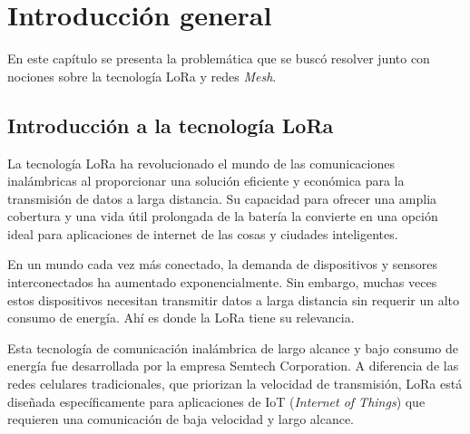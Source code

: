 
\chapter{Introducción general} %

\label{Chapter1} %
\label{IntroGeneral}


\newcommand{\keyword}[1]{\textbf{#1}}
\newcommand{\tabhead}[1]{\textbf{#1}}
\newcommand{\code}[1]{\texttt{#1}}
\newcommand{\file}[1]{\texttt{\bfseries#1}}
\newcommand{\option}[1]{\texttt{\itshape#1}}
\newcommand{\grados}{$^{\circ}$}

En este capítulo se presenta la problemática que se buscó resolver junto con nociones sobre la tecnología LoRa y redes \emph{Mesh}.

\section{Introducción a la tecnología LoRa}

La tecnología LoRa ha revolucionado el mundo de las comunicaciones inalámbricas al proporcionar una solución eficiente y económica para la transmisión de datos a larga distancia. Su capacidad para ofrecer una amplia cobertura y una vida útil prolongada de la batería la convierte en una opción ideal para aplicaciones de internet de las cosas y ciudades inteligentes.

En un mundo cada vez más conectado, la demanda de dispositivos y sensores interconectados ha aumentado exponencialmente. Sin embargo, muchas veces estos dispositivos necesitan transmitir datos a larga distancia sin requerir un alto consumo de energía. Ahí es donde la LoRa tiene su relevancia.

Esta tecnología de comunicación inalámbrica de largo alcance y bajo consumo de energía fue desarrollada por la empresa Semtech Corporation. \citep{WEBSITE:6} A diferencia de las redes celulares tradicionales, que priorizan la velocidad de transmisión, LoRa está diseñada específicamente para aplicaciones de IoT (\emph{Internet of Things}) que requieren una comunicación de baja velocidad y largo alcance. 

